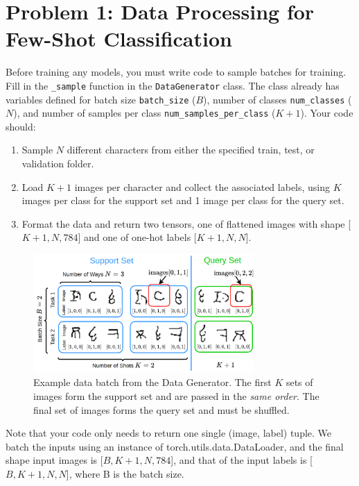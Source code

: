 \documentclass[12pt]{article}
\begin{document}
    \section*{Problem 1: Data Processing for Few-Shot Classification}

    Before training any models, you must write code to sample batches for training. Fill in the \texttt{\_sample} function in the \texttt{DataGenerator} class. The class already has variables defined for batch size \texttt{batch\_size} ($B$), number of classes \texttt{num\_classes} ($N$), and number of samples per class \texttt{num\_samples\_per\_class} ($K+1$). Your code should:
    \begin{enumerate}
        \item Sample $N$ different characters from either the specified train, test, or validation folder.
        \item Load $K+1$ images per character and collect the associated labels, using $K$ images per class for the support set and 1 image per class for the query set.
        \item Format the data and return two tensors, one of flattened images with shape [$K+1, N, 784$] and one of one-hot labels [$K+1, N, N$].
    \end{enumerate}

    \begin{figure}
        \centering
        \includegraphics[width = 0.75\textwidth]{figures/hw1_batch_v4.png}
        \vspace{-0.3cm}
        \caption{\small Example data batch from the Data Generator. The first $K$ sets of images form the support set and are passed in the \emph{same order}. The final set of images forms the query set and must be shuffled.}
        \label{fig:batch}
    \end{figure}
    Note that your code only needs to return one single (image, label) tuple. We batch the inputs using an instance of torch.utils.data.DataLoader, and the final shape input images is [$B, K+1, N, 784$], and that of the input labels is [$B, K+1, N, N$], where B is the batch size.
\end{document}
